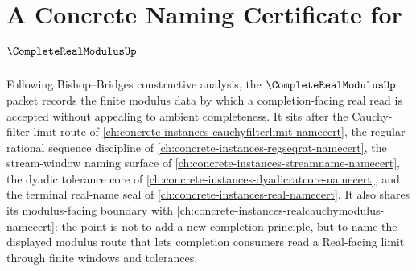 \chapter{A Concrete Naming Certificate for $\CompleteRealModulusUp$}
\label{ch:concrete-instances-complete-real-modulus-namecert}

Following Bishop--Bridges constructive analysis, the $\CompleteRealModulusUp$ packet records the finite modulus data by which a completion-facing real read is accepted without appealing to ambient completeness. It sits after the Cauchy-filter limit route of \autoref{ch:concrete-instances-cauchyfilterlimit-namecert}, the regular-rational sequence discipline of \autoref{ch:concrete-instances-regseqrat-namecert}, the stream-window naming surface of \autoref{ch:concrete-instances-streamname-namecert}, the dyadic tolerance core of \autoref{ch:concrete-instances-dyadicratcore-namecert}, and the terminal real-name seal of \autoref{ch:concrete-instances-real-namecert}. It also shares its modulus-facing boundary with \autoref{ch:concrete-instances-realcauchymodulus-namecert}: the point is not to add a new completion principle, but to name the displayed modulus route that lets completion consumers read a Real-facing limit through finite windows and tolerances.


